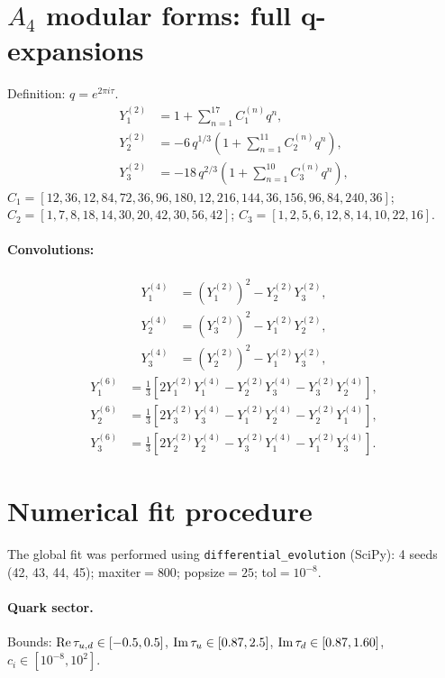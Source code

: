\documentclass[12pt,a4paper]{article}
\numberwithin{equation}{section}
\begin{document}
\appendix
\newpage

\section{\(A_4\) modular forms: full q-expansions}
Definition: \(q = e^{2\pi i\tau}\).
\begin{align}
Y_1^{(2)} &= 1 + \sum_{n=1}^{17} C_1^{(n)} q^n, \\
Y_2^{(2)} &= -6\, q^{1/3}\left(1 + \sum_{n=1}^{11} C_2^{(n)} q^n\right), \\
Y_3^{(2)} &= -18\, q^{2/3}\left(1 + \sum_{n=1}^{10} C_3^{(n)} q^n\right),
\end{align}
\(C_1 = [12, 36, 12, 84, 72, 36, 96, 180, 12, 216, 144, 36, 156, 96, 84, 240, 36]\);
\(C_2 = [1, 7, 8, 18, 14, 30, 20, 42, 30, 56, 42]\);
\(C_3 = [1, 2, 5, 6, 12, 8, 14, 10, 22, 16]\).
\paragraph{Convolutions:}
\begin{align}
Y_1^{(4)} &= (Y_1^{(2)})^2 - Y_2^{(2)} Y_3^{(2)}, \\
Y_2^{(4)} &= (Y_3^{(2)})^2 - Y_1^{(2)} Y_2^{(2)}, \\
Y_3^{(4)} &= (Y_2^{(2)})^2 - Y_1^{(2)} Y_3^{(2)},
\end{align}
\begin{align}
Y_1^{(6)} &= \tfrac13\left[2 Y_1^{(2)} Y_1^{(4)} - Y_2^{(2)} Y_3^{(4)} - Y_3^{(2)} Y_2^{(4)}\right], \\
Y_2^{(6)} &= \tfrac13\left[2 Y_3^{(2)} Y_3^{(4)} - Y_1^{(2)} Y_2^{(4)} - Y_2^{(2)} Y_1^{(4)}\right], \\
Y_3^{(6)} &= \tfrac13\left[2 Y_2^{(2)} Y_2^{(4)} - Y_3^{(2)} Y_1^{(4)} - Y_1^{(2)} Y_3^{(4)}\right].
\end{align}

\section{Numerical fit procedure}
The global fit was performed using \texttt{differential\_evolution} (SciPy): 4 seeds (42, 43, 44, 45); maxiter\(=800\); popsize\(=25\); tol\(=10^{-8}\).
\paragraph{Quark sector.} Bounds: \({\rm Re}\,\tau_{u,d}\in[-0.5,0.5]\), \({\rm Im}\,\tau_u\in[0.87,2.5]\), \({\rm Im}\,\tau_d\in[0.87,1.60]\), \(c_i\in[10^{-8},10^2]\).
\end{document}
